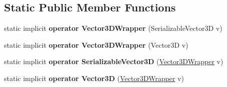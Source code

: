 \subsection*{Static Public Member Functions}
\begin{DoxyCompactItemize}
\item 
\hypertarget{struct_s_e_mod_a_p_i_1_1_a_p_i_1_1_type_converters_1_1_vector3_d_wrapper_af5343683cf994996102673bc524e978a}{}static implicit {\bfseries operator Vector3\+D\+Wrapper} (Serializable\+Vector3\+D v)\label{struct_s_e_mod_a_p_i_1_1_a_p_i_1_1_type_converters_1_1_vector3_d_wrapper_af5343683cf994996102673bc524e978a}

\item 
\hypertarget{struct_s_e_mod_a_p_i_1_1_a_p_i_1_1_type_converters_1_1_vector3_d_wrapper_a07c45ccdbee7fe7e58ac8897fe4064ef}{}static implicit {\bfseries operator Vector3\+D\+Wrapper} (Vector3\+D v)\label{struct_s_e_mod_a_p_i_1_1_a_p_i_1_1_type_converters_1_1_vector3_d_wrapper_a07c45ccdbee7fe7e58ac8897fe4064ef}

\item 
\hypertarget{struct_s_e_mod_a_p_i_1_1_a_p_i_1_1_type_converters_1_1_vector3_d_wrapper_a5a58750f0d6474b516f4727e3fabca4b}{}static implicit {\bfseries operator Serializable\+Vector3\+D} (\hyperlink{struct_s_e_mod_a_p_i_1_1_a_p_i_1_1_type_converters_1_1_vector3_d_wrapper}{Vector3\+D\+Wrapper} v)\label{struct_s_e_mod_a_p_i_1_1_a_p_i_1_1_type_converters_1_1_vector3_d_wrapper_a5a58750f0d6474b516f4727e3fabca4b}

\item 
\hypertarget{struct_s_e_mod_a_p_i_1_1_a_p_i_1_1_type_converters_1_1_vector3_d_wrapper_a512445e246f8c6304a04432b6e8be75c}{}static implicit {\bfseries operator Vector3\+D} (\hyperlink{struct_s_e_mod_a_p_i_1_1_a_p_i_1_1_type_converters_1_1_vector3_d_wrapper}{Vector3\+D\+Wrapper} v)\label{struct_s_e_mod_a_p_i_1_1_a_p_i_1_1_type_converters_1_1_vector3_d_wrapper_a512445e246f8c6304a04432b6e8be75c}

\end{DoxyCompactItemize}
